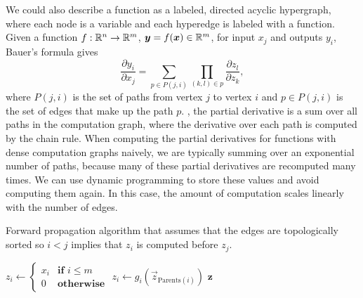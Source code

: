 We could also describe a function as a labeled, directed acyclic hypergraph, where each node is a variable
and each hyperedge is labeled with a function. Given a function
$f:\mathbb{R}^n\to\mathbb{R}^m$, $\bm{y}=f(\bm{x})\in\mathbb{R}^m$, for input $x_j$ and outputs
$y_i$, Bauer's formula gives
\begin{equation} \label{eq:bauer}
  \frac{\partial y_i}{\partial x_j} = \sum_{p\in P(j,i)} \prod_{(k,l)\in p} \frac{\partial z_l}{\partial z_k}
,\end{equation}
where $P(j,i)$ is the set of paths from vertex $j$ to vertex $i$ and $p\in
P(j,i)$ is the set of edges that make up the path $p$. \Ie, the partial
derivative is a sum over all paths in the computation graph, where the
derivative over each path is computed by the chain
rule. When
computing the partial derivatives for functions with dense computation graphs
naively, we are typically summing over an exponential number of paths, because
many of these partial derivatives are recomputed many times. We can use dynamic
programming to store these values and avoid computing them again. In this case,
the amount of computation scales linearly with the number of edges.

\begin{algorithm}
  \caption{Forward propagation algorithm that assumes that the edges are
  topologically sorted so $i<j$ implies that $z_i$ is computed before $z_j$.}
  \label{alg:forward-propagation}

  \begin{algorithmic}[1]
      \State $z_i \gets \begin{cases}
        x_i & \textbf{if } i \leq m \\
        0 & \textbf{otherwise}
      \end{cases}$ 
        \State $z_i \gets g_i(\vec{z}_{\mathrm{Parents}(i)})$ 
      \EndFor
      \State \Return $\bm{z}$
    \EndFunction
  \end{algorithmic}
\end{algorithm}


